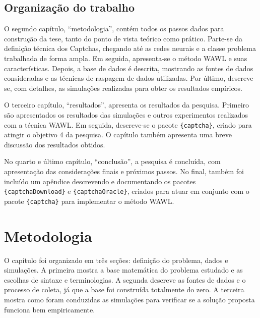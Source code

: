 \documentclass[12pt,twoside,brazilian]{book}
\begin{document}
\hypertarget{sec-organizacao}{%
\section{Organização do trabalho}\label{sec-organizacao}}

O segundo capítulo, ``metodologia'', contém todos os passos dados para
construção da tese, tanto do ponto de vista teórico como prático.
Parte-se da definição técnica dos Captchas, chegando até as redes
neurais e a classe problema trabalhada de forma ampla. Em seguida,
apresenta-se o método WAWL e suas características. Depois, a base de
dados é descrita, mostrando as fontes de dados consideradas e as
técnicas de raspagem de dados utilizadas. Por último, descreve-se, com
detalhes, as simulações realizadas para obter os resultados empíricos.

O terceiro capítulo, ``resultados'', apresenta os resultados da
pesquisa. Primeiro são apresentados os resultados das simulações e
outros experimentos realizados com a técnica WAWL. Em seguida,
descreve-se o pacote \texttt{\{captcha\}}, criado para atingir o
objetivo 4 da pesquisa. O capítulo também apresenta uma breve discussão
dos resultados obtidos.

No quarto e último capítulo, ``conclusão'', a pesquisa é concluída, com
apresentação das considerações finais e próximos passos. No final,
também foi incluído um apêndice descrevendo e documentando os pacotes
\texttt{\{captchaDownload\}} e \texttt{\{captchaOracle\}}, criados para
atuar em conjunto com o pacote \texttt{\{captcha\}} para implementar o
método WAWL.


\hypertarget{sec-metodologia}{%
\chapter{Metodologia}\label{sec-metodologia}}


O capítulo foi organizado em três seções: definição do problema, dados e
simulações. A primeira mostra a base matemática do problema estudado e
as escolhas de sintaxe e terminologias. A segunda descreve as fontes de
dados e o processo de coleta, já que a base foi construída totalmente do
zero. A terceira mostra como foram conduzidas as simulações para
verificar se a solução proposta funciona bem empiricamente.
\end{document}
